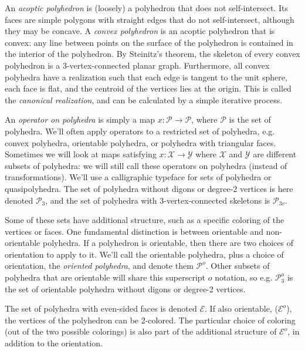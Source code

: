 \documentclass[12pt]{amsart}%
\begin{document}
An \textit{acoptic polyhedron} is (loosely) a polyhedron that does not
self-intersect. \cite{grunbaum99} Its faces are simple polygons with straight
edges that do not self-intersect, although they may be concave. A
\textit{convex polyhedron} is an acoptic polyhedron that is convex: any line
between points on the surface of the polyhedron is contained in the interior of
the polyhedron. By Steinitz's theorem, the skeleton of every convex polyhedron
is a 3-vertex-connected planar graph. Furthermore, all convex polyhedra have a
realization such that each edge is tangent to the unit sphere, each face is
flat, and the centroid of the vertices lies at the origin.\cite{ziegler}
This is called the \textit{canonical realization},
and can be calculated by a simple iterative process.\cite{hart97}

An \textit{operator on polyhedra} is simply a map $x : \mathcal{P} \to
\mathcal{P}$, where $\mathcal{P}$ is the set of polyhedra. We'll often apply
operators to a restricted set of polyhedra, e.g. convex polyhedra, orientable
polyhedra, or polyhedra with triangular faces. Sometimes we will look at maps
satisfying $x : \mathcal{X} \to \mathcal{Y}$ where $\mathcal{X}$ and
$\mathcal{Y}$ are different subsets of polyhedra: we will still call these
operators on polyhedra (instead of transformations). We'll use a calligraphic
typeface for sets of polyhedra or quasipolyhedra. The set of polyhedra without
digons or degree-2 vertices is here denoted $\mathcal{P}_3$, and the set of
polyhedra with 3-vertex-connected skeletons is $\mathcal{P}_{3v}$.

Some of these sets have additional structure, such as a specific coloring of
the vertices or faces. One fundamental distinction is between orientable and
non-orientable polyhedra. If a polyhedron is orientable, then there are two
choices of orientation to apply to it. We'll call the orientable polyhedra,
plus a choice of orientation, the \textit{oriented polyhedra}, and denote them
$\mathcal{P}^o$. Other subsets of polyhedra that are orientable will share this
superscript $o$ notation, so e.g. $\mathcal{P}^o_3$ is the set of orientable
polyhedra without digons or degree-2 vertices.

The set of polyhedra with even-sided faces is denoted $\mathcal{E}$. If also
orientable, ($\mathcal{E}^o$), the vertices of the polyhedron can be 2-colored.
The particular choice of coloring (out of the two possible colorings) is also
part of the additional structure of $\mathcal{E}^o$,
in addition to the orientation.
\end{document}
